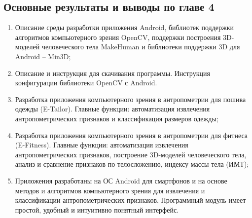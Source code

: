 \subsection{Основные результаты и выводы по главе 4}

\begin{enumerate}
	\item Описание среды разработки приложения Android, библиотек поддержки алгоритмов компьютерного зрения OpenCV, поддержки построения 3D-моделей человеческого тела MakeHuman и библиотеки поддержки 3D для Android – Min3D;
	\item Описание и инструкция для скачивания программы. Инструкция конфигурации библиотеки OpenCV с Android.
	\item Разработка приложения компьютерного зрения в антропометрии для пошива одежды (E-Tailor). Главные функции: автоматизация извлечения антропометрических признаков и классификация размеров одежды;
	\item Разработка приложения компьютерного зрения в антропометрии для фитнеса (E-Fitness). Главные функции: автоматизация извлечения антропометрических признаков, построение 3D-моделей человеческого тела, анализ и сравнение признаков по телосложению, индексу массы тела (ИМТ);
	\item Приложения разработаны на ОС Android для смартфонов и на основе методов и алгоритмов компьютерного зрения для извлечения и классификации антропометрических признаков. Программный модуль имеет простой, удобный и интуитивно понятный интерфейс.
\end{enumerate}
